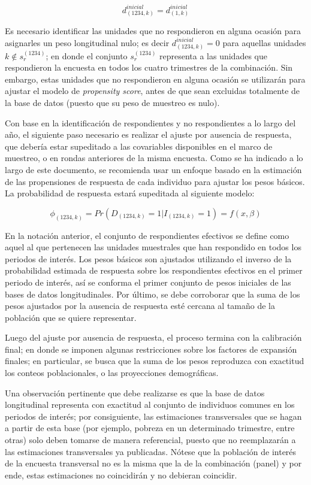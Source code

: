 \documentclass[
  12pt,
]{book}
\begin{document}
\[
d_{(1234,k)}^{inicial}=d_{(1,k)}^{inicial}
\]

Es necesario identificar las unidades que no respondieron en alguna ocasión para asignarles un peso longitudinal nulo; es decir
\(d_{(1234,k)}^{inicial}=0\) para aquellas unidades \(k \notin s_r^{(1234)}\); en donde el conjunto \(s_r^{(1234)}\) representa a las unidades que respondieron la encuesta en todos los cuatro trimestres de la combinación. Sin embargo, estas unidades que no respondieron en alguna ocasión se utilizarán para ajustar el modelo de \emph{propensity score}, antes de que sean excluidas totalmente de la base de datos (puesto que su peso de muestreo es nulo).

Con base en la identificación de respondientes y no respondientes a lo largo del año, el siguiente paso necesario es realizar el ajuste por ausencia de respuesta, que debería estar supeditado a las covariables disponibles en el marco de muestreo, o en rondas anteriores de la misma encuesta. Como se ha indicado a lo largo de este documento, se recomienda usar un enfoque basado en la estimación de las propensiones de respuesta de cada individuo para ajustar los pesos básicos. La probabilidad de respuesta estará supeditada al siguiente modelo:

\[
\phi_{(1234,k)}=Pr(D_{(1234,k)}=1|I_{(1234,k)}=1)=f(x,\beta)
\]

En la notación anterior, el conjunto de respondientes efectivos se define como aquel al que pertenecen las unidades muestrales que han respondido en todos los periodos de interés. Los pesos básicos son ajustados utilizando el inverso de la probabilidad estimada de respuesta sobre los respondientes efectivos en el primer periodo de interés, así se conforma el primer conjunto de pesos iniciales de las bases de datos longitudinales. Por último, se debe corroborar que la suma de los pesos ajustados por la ausencia de respuesta esté cercana al tamaño de la población que se quiere representar.

Luego del ajuste por ausencia de respuesta, el proceso termina con la calibración final; en donde se imponen algunas restricciones sobre los factores de expansión finales; en particular, se busca que la suma de los pesos reproduzca con exactitud los conteos poblacionales, o las proyecciones demográficas.

Una observación pertinente que debe realizarse es que la base de datos longitudinal representa con exactitud al conjunto de individuos comunes en los periodos de interés; por consiguiente, las estimaciones transversales que se hagan a partir de esta base (por ejemplo, pobreza en un determinado trimestre, entre otras) solo deben tomarse de manera referencial, puesto que no reemplazarán a las estimaciones transversales ya publicadas. Nótese que la población de interés de la encuesta transversal no es la misma que la de la combinación (panel) y por ende, estas estimaciones no coincidirán y no debieran coincidir.
\end{document}
